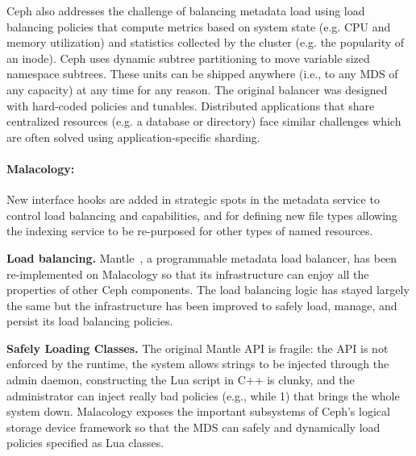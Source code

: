 \documentclass[10pt,twocolumn]{article}
\begin{document}
Ceph also addresses the challenge of balancing metadata load using load
balancing policies that compute metrics based on system state (e.g.  CPU and
memory utilization) and statistics collected by the cluster (e.g. the
popularity of an inode). Ceph uses dynamic subtree partitioning to move
variable sized namespace subtrees. These units can be shipped anywhere (i.e.,
to any MDS of any capacity) at any time for any reason. The original balancer
was designed with hard-coded policies and tunables.  Distributed applications
that share centralized resources (e.g. a database or directory) face similar
challenges which are often solved using application-specific sharding. 


\paragraph*{Malacology:} New interface hooks are added in strategic spots in
the metadata service to control load balancing and capabilities, and for
defining new file types allowing the indexing service to be re-purposed for
other types of named resources.

{\bf Load balancing.} Mantle~\cite{sevilla:sc15-mantle}, a programmable
metadata load balancer, has been re-implemented on Malacology so that its
infrastructure can enjoy all the properties of other Ceph components. The load
balancing logic has stayed largely the same but the infrastructure has been
improved to safely load, manage, and persist its load balancing policies. 

{\bf Safely Loading Classes.} The original Mantle API is fragile: the API is
not enforced by the runtime, the system allows strings to be injected through
the admin daemon, constructing the Lua script in C++ is clunky, and the
administrator can inject really bad policies (e.g., while 1) that brings the
whole system down. Malacology exposes the important subsystems of Ceph's
logical storage device framework so that the MDS can safely and dynamically
load policies specified as Lua classes.
\end{document}
